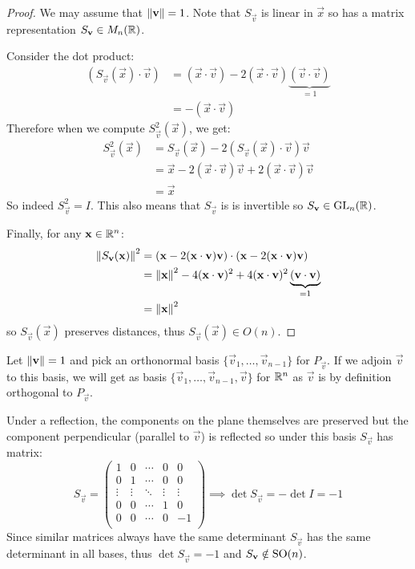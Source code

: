 \documentclass[../main.tex]{subfiles}
\begin{document}
\begin{proof}
  We may assume that $\left\lVert \mathbf{\bm{v}} \right\rVert = 1$.
  Note that $S_{\vec{v}}$ is linear in $\vec{x}$ so has a matrix representation $S_{\mathbf{\bm{v}}} \in M_n(\mathbb{R})$.

  Consider the dot product:
  \begin{align*}
    (S_{\vec{v}}(\vec{x}) \cdot \vec{v}) &= (\vec{x} \cdot \vec{v}) - 2(\vec{x} \cdot \vec{v})\underbrace{(\vec{v} \cdot \vec{v})}_{=1} \\
                                         &= - (\vec{x} \cdot \vec{v})
  \end{align*}
  Therefore when we compute $S^{2}_{\vec{v}}(\vec{x})$, we get:
  \begin{align*}
    S^{2}_{\vec{v}}(\vec{x}) &= S_{\vec{v}}(\vec{x}) - 2(S_{\vec{v}}(\vec{x}) \cdot \vec{v})\vec{v} \\
                             &= \vec{x} - 2(\vec{x} \cdot \vec{v})\vec{v} + 2(\vec{x} \cdot \vec{v}) \vec{v} \\
                             &= \vec{x}
  \end{align*}
  So indeed $S^{2}_{\vec{v}} = I$.
  This also means that $S_{\vec{v}}$ is is invertible so $S_{\mathbf{\bm{v}}} \in \mathrm{GL}_n(\mathbb{R})$.

  Finally, for any $\mathbf{\bm{x}} \in \mathbb{R}^{n}$:
  \begin{align*}
    \left\lVert S_{\mathbf{\bm{v}}}(\mathbf{\bm{x}}) \right\rVert^2 &= (\mathbf{\bm{x}} - 2(\mathbf{\bm{x}} \cdot \mathbf{\bm{v}})\mathbf{\bm{v}}) \cdot (\mathbf{\bm{x}} - 2(\mathbf{\bm{x}} \cdot \mathbf{\bm{v}})\mathbf{\bm{v}}) \\
                                  &= \left\lVert \mathbf{\bm{x}} \right\rVert^2 - 4(\mathbf{\bm{x}} \cdot \mathbf{\bm{v}})^2 + 4(\mathbf{\bm{x}} \cdot \mathbf{\bm{v}})^2 \underbrace{(\mathbf{\bm{v}} \cdot \mathbf{\bm{v}})}_{=1} \\
                                  &= \left\lVert \mathbf{\bm{x}} \right\rVert^2
  \end{align*}
  so $S_{\vec{v}}(\vec{x})$ preserves distances, thus $S_{\vec{v}}(\vec{x}) \in O(n)$.
\end{proof}
\begin{remark}
  Let $\left\lVert \mathbf{\bm{v}} \right\rVert = 1$ and pick an orthonormal basis $\{\vec{v}_1, \ldots, \vec{v}_{n - 1}\}$ for $P_{\vec{v}}$.
  If we adjoin $\vec{v}$ to this basis, we will get as basis $\{\vec{v}_1, \ldots, \vec{v}_{n - 1}, \vec{v}\}$ for $\mathbb{R}^{n}$ as $\vec{v}$ is by definition orthogonal to $P_{\vec{v}}$.

  Under a reflection, the components on the plane themselves are preserved but the component perpendicular (parallel to $\vec{v}$) is reflected so under this basis $S_{\vec{v}}$ has matrix:
  \[
    S_{\vec{v}} = \begin{pmatrix}
      1 & 0 & \cdots & 0 & 0\\
      0 & 1 & \cdots & 0 & 0 \\
      \vdots & \vdots & \ddots & \vdots & \vdots \\
      0 & 0 & \cdots & 1 & 0\\
      0 & 0 & \cdots & 0& -1 \\
    \end{pmatrix} \implies \det S_{\vec{v}} = - \det I = -1
  \]
  Since similar matrices always have the same determinant $S_{\vec{v}}$ has the same determinant in all bases, thus $\det S_{\vec{v}} = -1$ and $S_{\mathbf{\bm{v}}} \notin \mathrm{SO}(n)$.
\end{remark}
\end{document}
